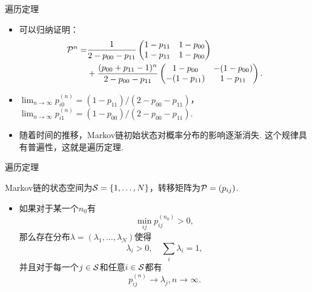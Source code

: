 {遍历定理}
\begin{itemize}
	\item 可以归纳证明：
	\begin{align*}
	    \P^n=&\frac{1}{2-p_{00}-p_{11}}\begin{pmatrix}1-p_{11}&1-p_{00}\\1-p_{11}&1-p_{00}\end{pmatrix}\\
	    &+\frac{(p_{00}+p_{11}-1)^n}{2-p_{00}-p_{11}}\begin{pmatrix}1-p_{00}&-(1-p_{00})\\-(1-p_{11})&1-p_{11}\end{pmatrix}.
	\end{align*}
	\item $\lim_{n\to\infty}p_{i0}^{(n)}=(1-p_{11})/(2-p_{00}-p_{11})$，$\lim_{n\to\infty}p_{i1}^{(n)}=(1-p_{00})/(2-p_{00}-p_{11})$.
	\item 随着时间的推移，Markov链初始状态对概率分布的影响逐渐消失. 这个规律具有普遍性，这就是遍历定理.
\end{itemize}


{遍历定理}
\begin{theorem}
Markov链的状态空间为$\MS=\{1,\dots,N\}$，转移矩阵为$\P=(p_{ij})$.
\begin{itemize}
    \item 如果对于某一个$n_0$有
    \begin{equation}
        \min_{ij}p_{ij}^{(n_0)}>0,\label{eq:reachable}
    \end{equation}
    那么存在分布$\lambda=(\lambda_1,\dots,\lambda_N)$使得
    \begin{equation}
        \lambda_i>0,\quad\sum_i\lambda_i=1,\label{eq:positive-distribution}
    \end{equation}
    并且对于每一个$j\in\MS$和任意$i\in\MS$都有
    \begin{equation}
    p_{ij}^{(n)}\to\lambda_j,n\to\infty.\label{eq:converge-to-limit}
    \end{equation}
\end{itemize}
\end{theorem}


